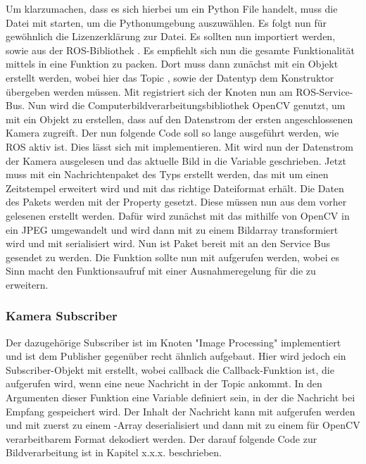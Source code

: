 Um klarzumachen, dass es sich hierbei um ein Python File handelt, muss die Datei mit  starten, um die Pythonumgebung auszuwählen. Es folgt nun für gewöhnlich die Lizenzerklärung zur Datei. Es sollten nun  importiert werden, sowie  aus der ROS-Bibliothek . Es empfiehlt sich nun die gesamte Funktionalität mittels  in eine Funktion zu packen. Dort muss dann zunächst mit  ein Objekt erstellt werden, wobei hier das Topic , sowie der Datentyp  dem Konstruktor übergeben werden müssen. Mit  registriert sich der Knoten nun am ROS-Service-Bus. Nun wird die Computerbildverarbeitungsbibliothek OpenCV genutzt, um mit  ein Objekt zu erstellen, dass auf den Datenstrom der ersten angeschlossenen Kamera zugreift. Der nun folgende Code soll so lange ausgeführt werden, wie ROS aktiv ist. Dies lässt sich mit  implementieren. Mit  wird nun der Datenstrom der Kamera ausgelesen und das aktuelle Bild in die Variable  geschrieben. Jetzt muss mit  ein Nachrichtenpaket des Typs  erstellt werden, das mit  um einen Zeitstempel erweitert wird und mit  das richtige Dateiformat erhält. Die Daten des Pakets werden mit der Property  gesetzt. Diese müssen nun aus dem vorher gelesenen  erstellt werden. Dafür wird zunächst mit  das  mithilfe von OpenCV in ein JPEG umgewandelt und wird dann mit  zu einem Bildarray transformiert wird und mit  serialisiert wird. Nun ist Paket bereit mit  an den Service Bus gesendet zu werden. Die Funktion sollte nun mit  aufgerufen werden, wobei es Sinn macht den Funktionsaufruf mit einer Ausnahmeregelung für die  zu erweitern. 
\subsubsection{Kamera Subscriber}
Der dazugehörige Subscriber ist im Knoten "Image Processing" implementiert und ist dem Publisher gegenüber recht ähnlich aufgebaut. Hier wird jedoch ein Subscriber-Objekt mit  erstellt, wobei callback die Callback-Funktion ist, die aufgerufen wird, wenn eine neue Nachricht in der Topic ankommt. In den Argumenten dieser Funktion eine Variable  definiert sein, in der die Nachricht bei Empfang gespeichert wird. Der Inhalt der Nachricht kann mit  aufgerufen werden und mit  zuerst zu einem -Array deserialisiert und dann mit  zu einem für OpenCV verarbeitbarem Format dekodiert werden. Der darauf folgende Code zur Bildverarbeitung ist in Kapitel x.x.x. beschrieben. \cite{aniskoubaa2019}
